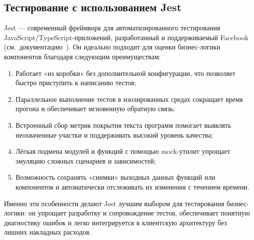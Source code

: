 \subsection{Тестирование с использованием Jest}

Jest — современный фреймворк для автоматизированного тестирования JavaScript/TypeScript-приложений, разработанный и поддерживаемый Facebook (см.~документацию~\cite{jest_docs}). Он идеально подходит для оценки бизнес-логики компонентов благодаря следующим преимуществам:
\begin{enumerate}
  \item Работает «из коробки» без дополнительной конфигурации, что позволяет быстро приступить к написанию тестов;
  \item Параллельное выполнение тестов в изолированных средах сокращает время прогона и обеспечивает мгновенную обратную связь;
  \item Встроенный сбор метрик покрытия текста программ помогает выявлять неохваченные участки и поддерживать высокий уровень качества;
  \item Лёгкая подмена модулей и функций с помощью mock-утилит упрощает эмуляцию сложных сценариев и зависимостей;
  \item Возможность сохранять «снимки» выходных данных функций или компонентов и автоматически отслеживать их изменения с течением времени.
\end{enumerate}

Именно эти особенности делают Jest лучшим выбором для тестирования бизнес-логики: он упрощает разработку и сопровождение тестов, обеспечивает понятную диагностику ошибок и легко интегрируется в клиентскую архитектуру без лишних накладных расходов.
